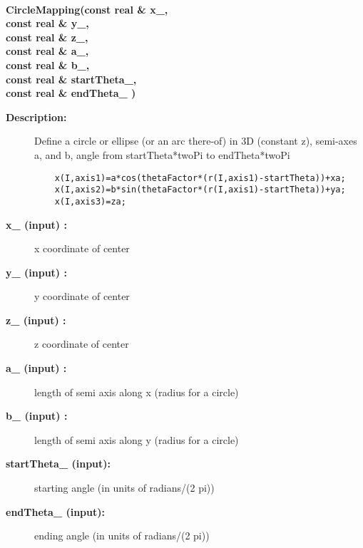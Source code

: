 \begin{flushleft} \textbf{%
  \\ 
\settowidth{\CircleMappingIncludeArgIndent}{CircleMapping(}%
CircleMapping(const real \& x\_, \\ 
\hspace{\CircleMappingIncludeArgIndent}const real \& y\_, \\ 
\hspace{\CircleMappingIncludeArgIndent}const real \& z\_, \\ 
\hspace{\CircleMappingIncludeArgIndent}const real \& a\_, \\ 
\hspace{\CircleMappingIncludeArgIndent}const real \& b\_, \\ 
\hspace{\CircleMappingIncludeArgIndent}const real \& startTheta\_, \\ 
\hspace{\CircleMappingIncludeArgIndent}const real \& endTheta\_ )
}\end{flushleft}
\begin{description}
\item[{\bf Description:}]  
   Define a circle or ellipse (or an arc there-of) in 3D (constant z), 
   semi-axes a, and b, angle from startTheta*twoPi to endTheta*twoPi

 \begin{verbatim}
    x(I,axis1)=a*cos(thetaFactor*(r(I,axis1)-startTheta))+xa; 
    x(I,axis2)=b*sin(thetaFactor*(r(I,axis1)-startTheta))+ya;
    x(I,axis3)=za;
 \end{verbatim}

\item[{\bf x\_ (input) :}]  x coordinate of center
\item[{\bf y\_ (input) :}]  y coordinate of center
\item[{\bf z\_ (input) :}]  z coordinate of center
\item[{\bf a\_ (input) :}]  length of semi axis along x (radius for a circle)
\item[{\bf b\_ (input) :}]  length of semi axis along y (radius for a circle)
\item[{\bf startTheta\_ (input):}]  starting angle (in units of radians/(2 pi))
\item[{\bf endTheta\_ (input):}]  ending angle (in units of radians/(2 pi))
\end{description}
